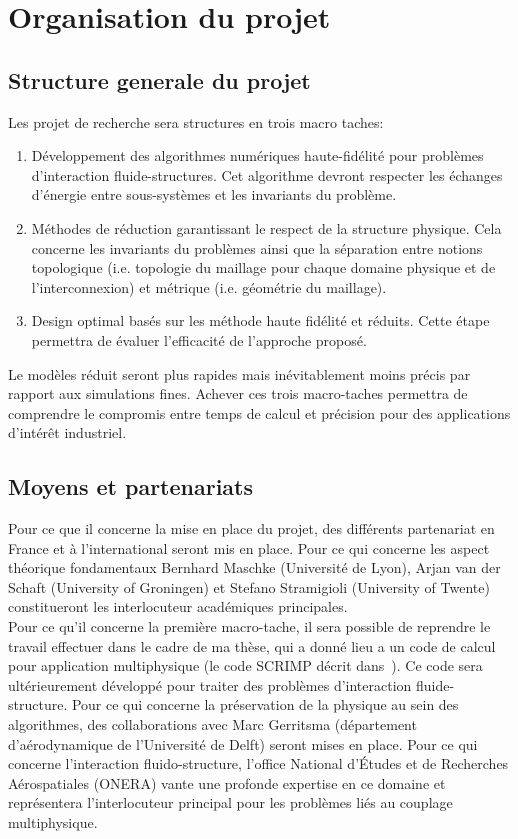\documentclass[french]{article}
\begin{document}
\section{Organisation du projet}

\subsection{Structure generale du projet}

Les projet de recherche sera structures en trois macro taches:
\begin{enumerate}
	\item Développement des algorithmes numériques haute-fidélité pour problèmes d'interaction fluide-structures. Cet algorithme devront respecter les échanges d'énergie entre sous-systèmes et les invariants du problème.
	\item Méthodes de réduction garantissant le respect de la structure physique. Cela concerne les invariants du problèmes ainsi que la séparation entre notions topologique (i.e. topologie du maillage pour chaque domaine physique et  de l'interconnexion) et métrique (i.e. géométrie du maillage).
	\item Design optimal basés sur les méthode haute fidélité et réduits. Cette étape permettra de évaluer l'efficacit\'e de l'approche propos\'e.
\end{enumerate}

Le modèles réduit seront plus rapides mais inévitablement moins précis par rapport aux simulations fines. Achever ces trois macro-taches permettra de comprendre le compromis entre temps de calcul et précision pour des applications d'intérêt industriel. 

\subsection{Moyens et partenariats}
Pour ce que il concerne la mise en place du projet, des différents partenariat en France et \`a l'international seront mis en place. Pour ce qui concerne les aspect théorique fondamentaux Bernhard Maschke (Universit\'e de Lyon), Arjan van der Schaft (University of Groningen) et Stefano Stramigioli (University of Twente) constitueront les interlocuteur académiques principales. \\

Pour ce qu'il concerne la première macro-tache, il sera possible de reprendre le travail effectuer dans le cadre de ma thèse, qui a donn\'e lieu a un code de calcul pour application multiphysique (le code SCRIMP décrit dans~\cite{brugnoli2021num}). Ce code sera ultérieurement développé pour traiter des problèmes d'interaction fluide-structure. Pour ce qui concerne la préservation de la physique au sein des algorithmes, des collaborations avec Marc Gerritsma (département d'aérodynamique de l'Universit\'e de Delft) seront mises en place. Pour ce qui concerne l'interaction fluido-structure, l'office National d'Études et de Recherches Aérospatiales (ONERA) vante une profonde expertise en ce domaine et représentera l'interlocuteur principal pour les problèmes liés au couplage multiphysique. 
\\
\end{document}
